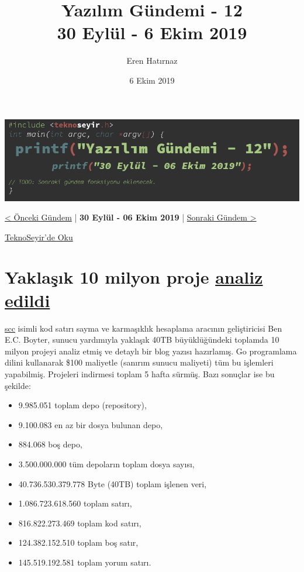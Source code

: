 \documentclass[11pt]{article}
\author{Eren Hatırnaz}
\date{6 Ekim 2019}
\title{Yazılım Gündemi - 12\\\medskip
\large 30 Eylül - 6 Ekim 2019}
\begin{document}
\maketitle
\tableofcontents \clearpage\shorthandoff{=}

\begin{center}
\includegraphics[width=.9\linewidth]{gorseller/yazilim-gundemi-banner.png}
\end{center}

\begin{center}
\href{../11/yazilim-gundemi-11.pdf}{< Önceki Gündem} | \textbf{30 Eylül - 06 Ekim 2019} | \href{../13/yazilim-gundemi-13.pdf}{Sonraki Gündem >}

\href{https://teknoseyir.com/blog/yazilim-gundemi-12-30-eylul-6-ekim-2019}{TeknoSeyir'de Oku}
\end{center}

\section{Yaklaşık 10 milyon proje \href{https://boyter.org/posts/an-informal-survey-of-10-million-github-bitbucket-gitlab-projects/}{analiz edildi}}
\label{sec:org5804e20}
\href{https://github.com/boyter/scc/}{scc} isimli kod satırı sayma ve karmaşıklık hesaplama aracının geliştiricisi Ben
E.C. Boyter, sunucu yardımıyla yaklaşık 40TB büyüklüğündeki toplamda 10 milyon
projeyi analiz etmiş ve detaylı bir blog yazısı hazırlamış. Go programlama
dilini kullanarak \$100 maliyetle (sanırım sunucu maliyeti) tüm bu işlemleri
yapabilmiş. Projeleri indirmesi toplam 5 hafta sürmüş. Bazı sonuçlar ise bu
şekilde:

\begin{itemize}
\item 9.985.051 toplam depo (repository),
\item 9.100.083 en az bir dosya bulunan depo,
\item 884.068 boş depo,
\item 3.500.000.000 tüm depoların toplam dosya sayısı,
\item 40.736.530.379.778 Byte (40TB) toplam işlenen veri,
\item 1.086.723.618.560 toplam satırı,
\item 816.822.273.469 toplam kod satırı,
\item 124.382.152.510 toplam boş satır,
\item 145.519.192.581 toplam yorum satırı.
\end{itemize}
\end{document}
